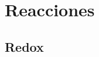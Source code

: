 \documentclass[../Teoría.root.tex]{subfiles}
\begin{document}
\section{Reacciones}
\subsection{Redox}
\end{document}

